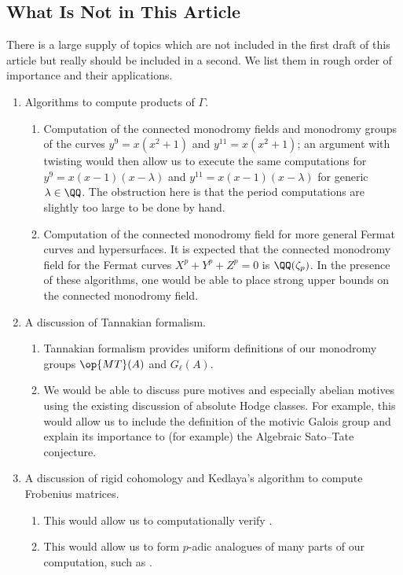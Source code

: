 \documentclass[openany]{book}
\begin{document}
\subsection{What Is Not in This Article}
There is a large supply of topics which are not included in the first draft of this article but really should be included in a second. We list them in rough order of importance and their applications.
\begin{enumerate}
	\item Algorithms to compute products of $\Gamma$.
	\begin{enumerate}
		\item Computation of the connected monodromy fields and monodromy groups of the curves $y^9=x\left(x^2+1\right)$ and $y^{11}=x\left(x^2+1\right)$; an argument with twisting would then allow us to execute the same computations for $y^9=x(x-1)(x-\lambda)$ and $y^{11}=x(x-1)(x-\lambda)$ for generic $\lambda\in\QQ$. The obstruction here is that the period computations are slightly too large to be done by hand.
		\item Computation of the connected monodromy field for more general Fermat curves and hypersurfaces. It is expected that the connected monodromy field for the Fermat curves $X^p+Y^p+Z^p=0$ is $\QQ(\zeta_p)$. In the presence of these algorithms, one would be able to place strong upper bounds on the connected monodromy field.
	\end{enumerate}
	\item A discussion of Tannakian formalism.
	\begin{enumerate}
		\item Tannakian formalism provides uniform definitions of our monodromy groups $\op{MT}(A)$ and $G_\ell(A)$.
		\item We would be able to discuss pure motives and especially abelian motives using the existing discussion of absolute Hodge classes. For example, this would allow us to include the definition of the motivic Galois group and explain its importance to (for example) the Algebraic Sato--Tate conjecture.
	\end{enumerate}
	\item A discussion of rigid cohomology and Kedlaya's algorithm to compute Frobenius matrices.
	\begin{enumerate}
		\item This would allow us to computationally verify .
		\item This would allow us to form $p$-adic analogues of many parts of our computation, such as .
	\end{enumerate}
\end{enumerate}
\end{document}
